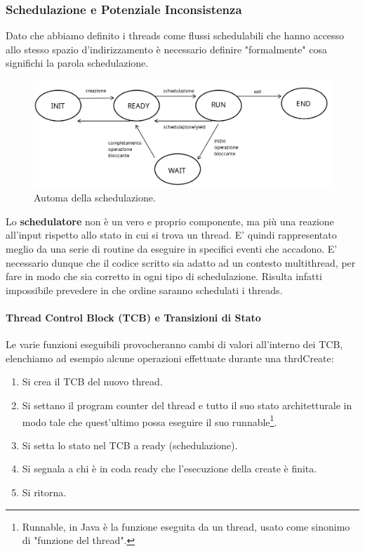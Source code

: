 \documentclass{article}
\begin{document}
\newpage

\subsubsection{Schedulazione e Potenziale Inconsistenza}

Dato che abbiamo definito i threads come flussi schedulabili che hanno accesso allo stesso spazio d'indirizzamento è necessario definire "formalmente"
cosa significhi la parola schedulazione.

\begin{figure}[htbp]
    \center
    \includegraphics[scale=0.325]{img/automa_schedulatore.png}
    \caption{Automa della schedulazione.}
\end{figure}

Lo \textbf{schedulatore} non è un vero e proprio componente, ma più una reazione all'input rispetto allo stato in cui si trova un thread. E' quindi rappresentato
meglio da una serie di routine da eseguire in specifici eventi che accadono. E' necessario dunque che il codice scritto sia adatto ad un contesto multithread, per
fare in modo che sia corretto in ogni tipo di schedulazione. Risulta infatti impossibile prevedere in che ordine saranno schedulati i threads. 

\paragraph{Thread Control Block (TCB) e Transizioni di Stato} Le varie funzioni eseguibili provocheranno cambi di valori all'interno dei TCB, elenchiamo ad esempio alcune operazioni effettuate durante
una thrdCreate:

\begin{enumerate}
    \item Si crea il TCB del nuovo thread.
    \item Si settano il program counter del thread e tutto il suo stato architetturale in modo tale che quest'ultimo possa eseguire il suo runnable\footnote{Runnable, in Java è la funzione eseguita da un thread, usato come sinonimo di "funzione del thread".}.
    \item Si setta lo stato nel TCB a ready (schedulazione).
    \item Si segnala a chi è in coda ready che l'esecuzione della create è finita.
    \item Si ritorna.
\end{enumerate}
\end{document}
